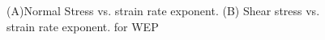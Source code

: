 \documentclass[12pt]{article}
\begin{document}
{\begin{figure}[H]
\centering
\hspace{-0.85cm}
\hspace{-0.1cm}

\caption{(A)Normal Stress vs. strain rate exponent. 
(B) Shear stress vs. strain rate exponent. 
 for WEP}
\label{fig:stress_distrib1}
\end{figure}


}
\end{document}
